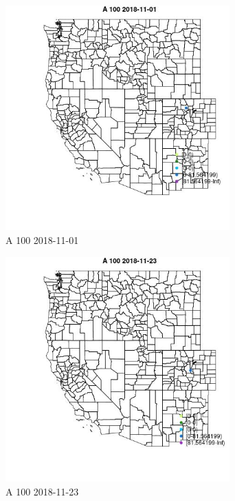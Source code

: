 \begin{figure} 
\centering  
\includegraphics[width=0.77\textwidth]{Code_Outputs/Report_ML_input_PM25_Step4_part_e_de_duplicated_aves_MapObsA_1002018-11-01.jpg} 
\caption{\label{fig:Report_ML_input_PM25_Step4_part_e_de_duplicated_avesMapObsA_1002018-11-01}A 100 2018-11-01} 
\end{figure} 
 

\begin{figure} 
\centering  
\includegraphics[width=0.77\textwidth]{Code_Outputs/Report_ML_input_PM25_Step4_part_e_de_duplicated_aves_MapObsA_1002018-11-23.jpg} 
\caption{\label{fig:Report_ML_input_PM25_Step4_part_e_de_duplicated_avesMapObsA_1002018-11-23}A 100 2018-11-23} 
\end{figure} 
 


